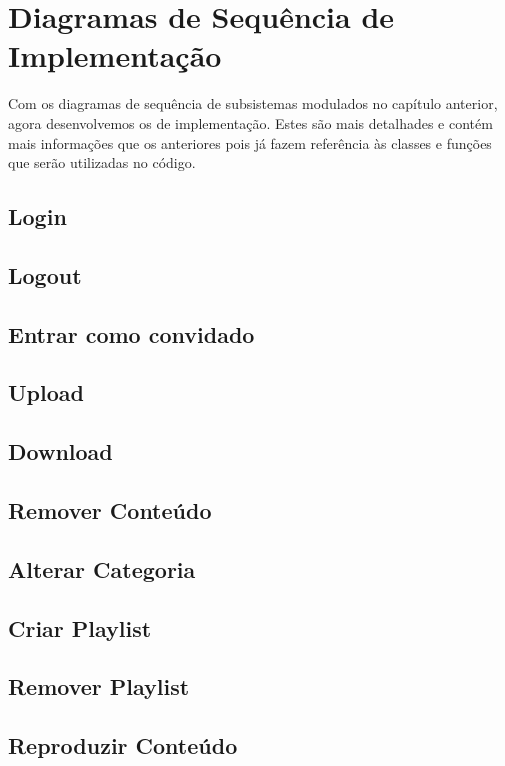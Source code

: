 \documentclass[a4paper]{report}
\begin{document}
\chapter{Diagramas de Sequência de Implementação}

Com os diagramas de sequência de subsistemas modulados no capítulo anterior,
agora desenvolvemos os de implementação. Estes são mais detalhades e contém
mais informações que os anteriores pois já fazem referência às classes e
funções que serão utilizadas no código.

\section{Login}

\section{Logout}

\section{Entrar como convidado}

\section{Upload}

\section{Download}

\section{Remover Conteúdo}

\section{Alterar Categoria}

\section{Criar Playlist}

\section{Remover Playlist}

\section{Reproduzir Conteúdo}
\end{document}
